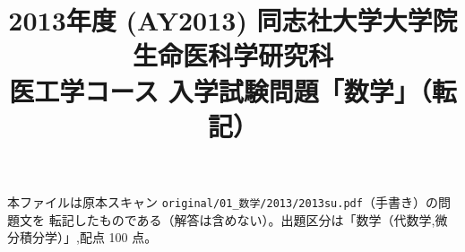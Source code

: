 \documentclass[11pt,a4paper]{article}
\title{2013年度 (AY2013) 同志社大学大学院 生命医科学研究科\\
医工学コース 入学試験問題「数学」（転記）}
\author{}
\date{}
\begin{document}
\maketitle
\vspace{-3em}

\begin{rem}
本ファイルは原本スキャン \texttt{original/01\_数学/2013/2013su.pdf}（手書き）の問題文を
転記したものである（解答は含めない）。出題区分は「数学（代数学,微分積分学）」,配点 100 点。
\end{rem}

\bigskip

\bigskip

\bigskip

\bigskip

\bigskip

\bigskip

\end{document}
